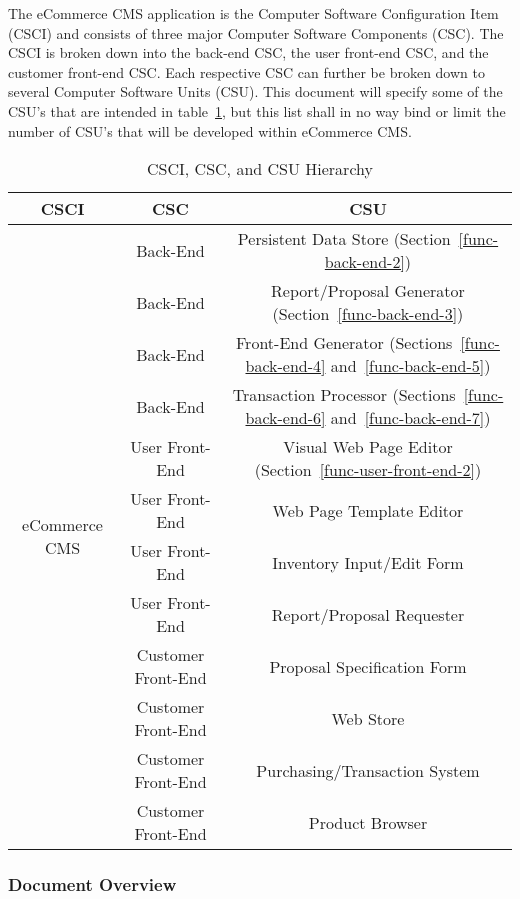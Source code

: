\documentclass{article}
\begin{document}
The eCommerce CMS application is the Computer Software Configuration Item 
(CSCI) and consists of three major Computer Software Components (CSC).  The 
CSCI is broken down into the back-end CSC, the user front-end CSC, and the 
customer front-end CSC.  Each respective CSC can further be broken down to 
several Computer Software Units (CSU).  This document will specify some of the 
CSU's that are intended in table~\ref{software-hierarchy}, but this list shall 
in no way bind or limit the number of CSU's that will be developed within 
eCommerce CMS.

\begin{table}
    \begin{tabular}{|c|c|c|}\hline
        CSCI & CSC & CSU \\\hline\hline
        \multirow{12}{*}{eCommerce CMS}
         & Back-End & Persistent Data Store (Section~\ref{func-back-end-2}) \\\cline{2-3}
         & Back-End & Report/Proposal Generator (Section~\ref{func-back-end-3}) \\\cline{2-3}
         & Back-End & Front-End Generator (Sections~\ref{func-back-end-4} and~\ref{func-back-end-5}) \\\cline{2-3}
         & Back-End & Transaction Processor (Sections~\ref{func-back-end-6} and~\ref{func-back-end-7}) \\\cline{2-3}
         & User Front-End & Visual Web Page Editor (Section~\ref{func-user-front-end-2}) \\\cline{2-3}
         & User Front-End & Web Page Template Editor \\\cline{2-3}
         & User Front-End & Inventory Input/Edit Form \\\cline{2-3}
         & User Front-End & Report/Proposal Requester \\\cline{2-3}
         & Customer Front-End & Proposal Specification Form \\\cline{2-3}
         & Customer Front-End & Web Store \\\cline{2-3}
         & Customer Front-End & Purchasing/Transaction System \\\cline{2-3}
         & Customer Front-End & Product Browser \\\hline
    \end{tabular}
    \caption{CSCI, CSC, and CSU Hierarchy}
    \label{software-hierarchy}
\end{table}

\subsubsection{Document Overview}
\end{document}
